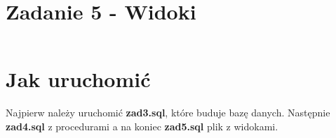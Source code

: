 \documentclass{article}
\begin{document}
\inputminted[breaklines]{sql}{../zad4.sql}

\section{Zadanie 5 - Widoki}
\inputminted[breaklines]{sql}{../zad5.sql}

\section{Jak uruchomić}

Najpierw należy uruchomić \textbf{zad3.sql}, które buduje bazę danych.
Następnie \textbf{zad4.sql} z procedurami a na koniec \textbf{zad5.sql}
plik z widokami.
\end{document}
